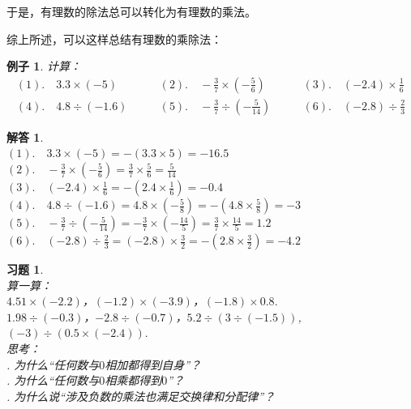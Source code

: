 \documentclass[12pt,UTF8]{ctexbook}
\newtheorem{ex}{例子}[section]
\newtheorem*{so}{解答}
\newtheorem{xt}{习题}[section]
\begin{document}
于是，有理数的除法总可以转化为有理数的乘法。

综上所述，可以这样总结有理数的乘除法：
\begin{center}
\end{center}
\begin{ex}
    计算：
    $$
    \begin{array}{lll}
        (1). \quad 3.3 \times (-5) \quad & \quad (2). \quad -\frac{3}{7} \times (- \frac{5}{6}) \quad & \quad (3). \quad (-2.4) \times \frac{1}{6} \\
        (4). \quad 4.8 \div (-1.6) \quad & \quad (5). \quad -\frac{3}{7} \div (- \frac{5}{14}) \quad & \quad (6). \quad (-2.8) \div \frac{2}{3}
    \end{array}
    $$
\end{ex}
\begin{so}
    \mbox{}\\
    \indent $(1). \quad 3.3 \times (-5) = -(3.3 \times 5) = -16.5$ \\
    \indent $(2). \quad -\frac{3}{7} \times (- \frac{5}{6}) = \frac{3}{7} \times \frac{5}{6} = \frac{5}{14}$ \\
    \indent $(3). \quad (-2.4) \times \frac{1}{6} = -(2.4 \times \frac{1}{6}) = -0.4$ \\
    \indent $(4). \quad 4.8 \div (-1.6) =  4.8 \times (-\frac{5}{8}) = -(4.8 \times \frac{5}{8}) = -3$ \\
    \indent $(5). \quad -\frac{3}{7} \div (- \frac{5}{14}) = -\frac{3}{7} \times (- \frac{14}{5}) = \frac{3}{7} \times \frac{14}{5} = 1.2$ \\
    \indent $(6). \quad (-2.8) \div \frac{2}{3} = (-2.8) \times \frac{3}{2} = -(2.8 \times \frac{3}{2}) = -4.2 $ 
\end{so}

\begin{xt}\label{xt:3-1-0}
    \mbox{}\\
    \indent 算一算：\\
    \indent $4.51 \times (-2.2)$，$(-1.2) \times (-3.9)$，$(-1.8)\times 0.8.$ \\
    \indent $1.98 \div (-0.3)$，$-2.8 \div (-0.7)$，$5.2 \div (3 \div (-1.5))$, $(-3) \div (0.5 \times (-2.4)).$ \\
    \indent 思考：\\
    . 为什么“任何数与$0$相加都得到自身”？\\
    . 为什么“任何数与$0$相乘都得到$0$”？\\
    . 为什么说“涉及负数的乘法也满足交换律和分配律”？
\end{xt}
\end{document}
